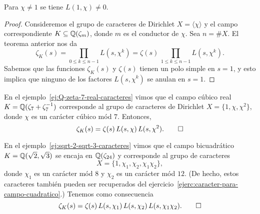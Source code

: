 \begin{corolario}
  \label{cor:L(1,chi)-ne-0}
  Para $\chi \ne 1$ se tiene $L (1,\chi) \ne 0$.

  \begin{proof}
    Consideremos el grupo de caracteres de Dirichlet $X = \langle\chi\rangle$
    y el campo correspondiente $K \subseteq \mathbb{Q} (\zeta_m)$, donde $m$ es
    el conductor de $\chi$. Sea $n = \# X$. El teorema anterior nos da
    \[ \zeta_K (s) = \prod_{0 \le k \le n-1} L (s,\chi^k) =
       \zeta (s) \, \prod_{1 \le k \le n-1} L (s,\chi^k). \]
    Sabemos que las funciones $\zeta_K (s)$ y $\zeta (s)$ tienen un polo simple
    en $s = 1$, y esto implica que ninguno de los factores $L (s,\chi^k)$
    se anulan en $s = 1$.
  \end{proof}
\end{corolario}

\begin{ejemplo}
  \label{ej:Q-zeta-7-real-zeta-descomp}
  En el ejemplo~\ref{ej:Q-zeta-7-real-caracteres} vimos que el campo cúbico real
  $K = \mathbb{Q} (\zeta_7 + \zeta_7^{-1})$ corresponde al grupo de caracteres de
  Dirichlet $X = \{ 1, \chi, \chi^2 \}$, donde $\chi$ es un carácter
  cúbico mód $7$. Entonces,
  \[ \zeta_K (s) = \zeta (s) \, L (s,\chi) \, L (s,\chi^2). \qedhere \]
\end{ejemplo}

\begin{ejemplo}
  \label{ej:sqrt-2-sqrt-3-zeta-descomp}
  En el ejemplo~\ref{ej:sqrt-2-sqrt-3-caracteres} vimos que el campo
  bicuadrático $K = \mathbb{Q} (\sqrt{2},\sqrt{3})$ se encaja en $\mathbb{Q} (\zeta_{24})$
  y corresponde al grupo de caracteres
  $$X = \{ 1, \chi_1, \chi_2, \chi_1\chi_2 \},$$
  donde $\chi_1$ es un carácter mód $8$ y $\chi_2$ es un carácter mód $12$.
  (De hecho, estos caracteres también pueden ser recuperados del
  ejercicio~\ref{ejerc:caracter-para-campo-cuadratico}.)
  Tenemos como consecuencia
  \[ \zeta_K (s) = \zeta (s)\,L (s,\chi_1)\,L (s,\chi_2)\,L (s,\chi_1\chi_2). \qedhere \]
\end{ejemplo}


